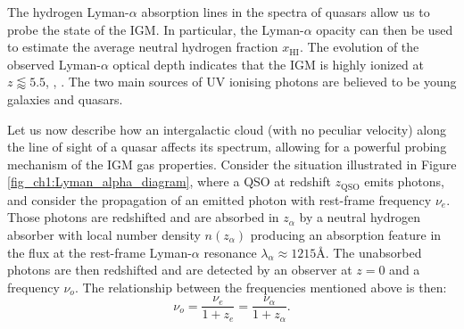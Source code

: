 The hydrogen Lyman-$\alpha$ absorption lines in the spectra of quasars allow us to probe the state of the IGM. In particular, the Lyman-$\alpha$ opacity can then be used to estimate the average neutral hydrogen fraction $x_\text{HI}$. The evolution of the observed Lyman-$\alpha$ optical depth indicates that the IGM is highly ionized at $z\lessapprox 5.5$, \cite{Becker_2001_GP_trough}, \cite{Ian_model_inde_reio}. The two main sources of UV ionising photons are believed to be young galaxies and quasars.

Let us now describe how an intergalactic cloud (with no peculiar velocity) along the line of sight of a quasar affects its spectrum, allowing for a powerful probing mechanism of the IGM gas properties. Consider the situation illustrated in Figure \ref{fig_ch1:Lyman_alpha_diagram}, where a QSO at redshift $z_\text{QSO}$ emits photons, and consider the propagation of an emitted photon with rest-frame frequency $\nu_e$. Those photons are redshifted and are absorbed in $z_\alpha$ by a neutral hydrogen absorber with local number density $n(z_\alpha)$ producing an absorption feature in the flux at the rest-frame Lyman-$\alpha$ resonance $\lambda_\alpha \approx 1215$\r{A}. The unabsorbed photons are then redshifted and are detected by an observer at $z=0$ and a frequency $\nu_o$. The relationship between the frequencies mentioned above is then:
\begin{equation}
    \nu_o=\frac{\nu_e}{1+z_e}=\frac{\nu_\alpha}{1+z_\alpha}. 
\end{equation}

